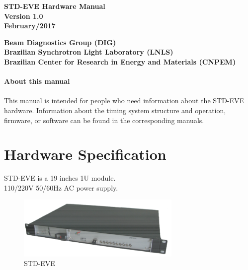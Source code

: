 \documentclass[openany]{article}
\begin{document}
\begin{titlepage}

\thispagestyle{fancy}

\begin{center}

\vspace*{\fill}
\textbf{\Huge STD-EVE Hardware Manual}\\[20pt]
\textbf{\Huge Version 1.0}\\[20pt]
\textbf{\Huge February/2017}
\vspace*{\fill}

\vfill
\textbf{Beam Diagnostics Group (DIG)}\\[5pt]
\textbf{Brazilian Synchrotron Light Laboratory (LNLS)}\\[5pt]
\textbf{Brazilian Center for Research in Energy and Materials (CNPEM)}
\end{center}

\end{titlepage}

\newpage
\pagestyle{plain} %

\paragraph{}{\Large\bfseries About this manual}

\paragraph{} This manual is intended for people who need information about the STD-EVE hardware. Information about the timing system structure and operation, firmware, or software can be found in the corresponding manuals.

\tableofcontents

\newpage
\section{Hardware Specification}

\par STD-EVE is a 19 inches 1U module. \\ 110/220V 50/60Hz AC power supply.

\begin{figure}[!h]
\caption{STD-EVE}
\label{fig:std-eve}
\centering
\includegraphics[width=0.7\textwidth]{std-eve-image}
\end{figure}
\end{document}

